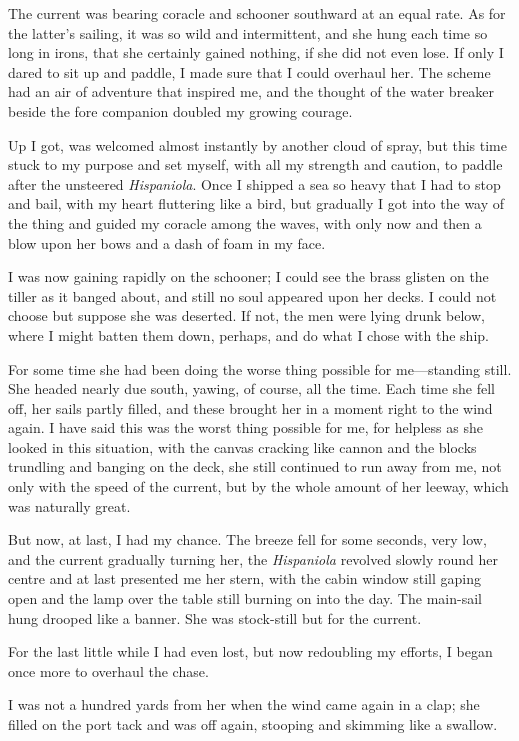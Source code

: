 The current was bearing coracle and schooner southward at an equal rate. As for the latter's sailing, it was so wild and intermittent, and she hung each time so long in irons, that she certainly gained nothing, if she did not even lose. If only I dared to sit up and paddle, I made sure that I could overhaul her. The scheme had an air of adventure that inspired me, and the thought of the water breaker beside the fore companion doubled my growing courage.

Up I got, was welcomed almost instantly by another cloud of spray, but this time stuck to my purpose and set myself, with all my strength and caution, to paddle after the unsteered \textit{Hispaniola}. Once I shipped a sea so heavy that I had to stop and bail, with my heart fluttering like a bird, but gradually I got into the way of the thing and guided my coracle among the waves, with only now and then a blow upon her bows and a dash of foam in my face.

I was now gaining rapidly on the schooner; I could see the brass glisten on the tiller as it banged about, and still no soul appeared upon her decks. I could not choose but suppose she was deserted. If not, the men were lying drunk below, where I might batten them down, perhaps, and do what I chose with the ship.

For some time she had been doing the worse thing possible for me—standing still. She headed nearly due south, yawing, of course, all the time. Each time she fell off, her sails partly filled, and these brought her in a moment right to the wind again. I have said this was the worst thing possible for me, for helpless as she looked in this situation, with the canvas cracking like cannon and the blocks trundling and banging on the deck, she still continued to run away from me, not only with the speed of the current, but by the whole amount of her leeway, which was naturally great.

But now, at last, I had my chance. The breeze fell for some seconds, very low, and the current gradually turning her, the \textit{Hispaniola} revolved slowly round her centre and at last presented me her stern, with the cabin window still gaping open and the lamp over the table still burning on into the day. The main-sail hung drooped like a banner. She was stock-still but for the current.

For the last little while I had even lost, but now redoubling my efforts, I began once more to overhaul the chase.

I was not a hundred yards from her when the wind came again in a clap; she filled on the port tack and was off again, stooping and skimming like a swallow.

